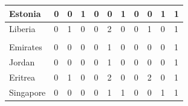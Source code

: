 \documentclass[12pt]{article}  %
\begin{document}
\begin{subappendices}
\begin{longtable}{|l|l|l|l|l|l|l|l|l|l|l|}
	\hline
	Estonia                                                        & 0                                                 & 0                                                 & 1                                                 & 0                                                 & 0                                                 & 1                                                 & 0    & 0      & 1      & 1      \\ 
	\hline
	Liberia                                                        & 0                                                 & 1                                                 & 0                                                 & 0                                                 & 2                                                 & 0                                                 & 0    & 1      & 0      & 1      \\ 
	\hline
	\begin{tabular}[c]{@{}l@{}}United Arab \\Emirates\end{tabular} & 0                                                 & 0                                                 & 0                                                 & 0                                                 & 1                                                 & 0                                                 & 0    & 0      & 0      & 1      \\ 
	\hline
	Jordan                                                         & 0                                                 & 0                                                 & 0                                                 & 0                                                 & 1                                                 & 0                                                 & 0    & 0      & 0      & 1      \\ 
	\hline
	Eritrea                                                        & 0                                                 & 1                                                 & 0                                                 & 0                                                 & 2                                                 & 0                                                 & 0    & 2      & 0      & 1      \\ 
	\hline
	Singapore                                                      & 0                                                 & 0                                                 & 0                                                 & 0                                                 & 1                                                 & 1                                                 & 0    & 0      & 1      & 1      \\ 

\end{longtable}
\end{subappendices}
\end{document}
